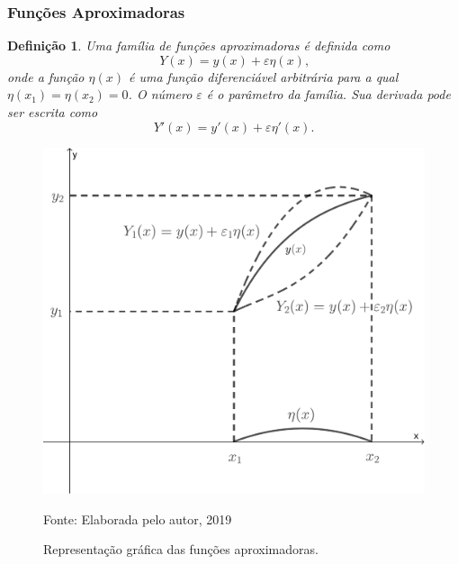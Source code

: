 \documentclass{beamer}
\newtheorem{definicao}{Definição}
\begin{document}
	\begin{frame}
		\frametitle{Funções Aproximadoras}
		\begin{definicao}
			\justify
			Uma família de funções aproximadoras é definida como
			$$Y(x)=y(x)+\varepsilon \eta (x)\text{,}$$
			onde a função $\eta (x)$ é uma função diferenciável arbitrária para a qual $\eta (x_1)=\eta (x_2)=0$. O número $\varepsilon$ é o parâmetro da família. Sua derivada pode ser escrita como
			$$Y'(x)=y'(x)+\varepsilon \eta '(x)\text{.}$$
		\end{definicao}
	\end{frame}

	\encapsulateBackgroundLessFrames
	{
		\begin{frame}
			\begin{figure}
				\caption{Representação gráfica das funções aproximadoras.}
				\begin{center}
					\includegraphics[scale=0.25]{../figuras/cap_calcvar/figura_001}\par
					{\small Fonte: Elaborada pelo autor, 2019}
				\end{center}
				\label{fig:func_approx}
			\end{figure}
		\end{frame}
	}
	
\end{document}
